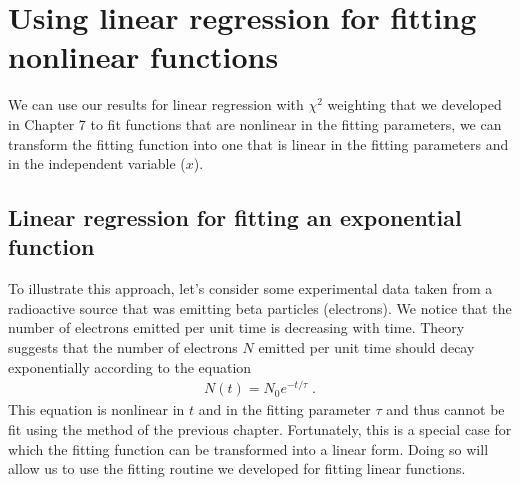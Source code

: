 \documentclass[letterpaper,10pt,english]{sphinxmanual}
\begin{document}
\section{Using linear regression for fitting non\sphinxhyphen{}linear functions}
\label{\detokenize{chap8/chap8_fitting:using-linear-regression-for-fitting-non-linear-functions}}
\sphinxAtStartPar
We can use our results for linear regression with \(\chi^2\) weighting that we developed in Chapter 7 to fit functions that are nonlinear in the fitting parameters,  we can transform the fitting function into one that is linear in the fitting parameters and in the independent variable (\(x\)).

\ignorespaces 

\subsection{Linear regression for fitting an exponential function}
\label{\detokenize{chap8/chap8_fitting:linear-regression-for-fitting-an-exponential-function}}\label{\detokenize{chap8/chap8_fitting:index-1}}
\sphinxAtStartPar
To illustrate this approach, let’s consider some experimental data taken from a radioactive source that was emitting beta particles (electrons).  We notice that the number of electrons emitted per unit time is decreasing with time.  Theory suggests that the number of electrons \(N\) emitted per unit time should decay exponentially according to the equation
\begin{equation}\label{equation:chap8/chap8_fitting:eq:decay}
\begin{split}N(t) = N_0 e^{-t/\tau} \;.\end{split}
\end{equation}
\sphinxAtStartPar
This equation is nonlinear in \(t\) and in the fitting parameter \(\tau\) and thus cannot be fit using the method of the previous chapter.  Fortunately, this is a special case for which the fitting function can be transformed into a linear form.  Doing so will allow us to use the fitting routine we developed for fitting linear functions.
\end{document}
